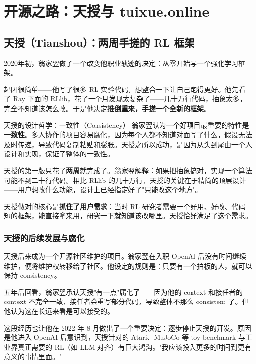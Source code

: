\documentclass[a4paper]{article}
\begin{document}
\section{开源之路：天授与 tuixue.online}

\subsection{天授（Tianshou）：两周手搓的 RL 框架}

2020年初，翁家翌做了一个改变他职业轨迹的决定：从零开始写一个强化学习框架。

起因很简单——他写了很多 RL 实验代码，想整合一下让自己跑得更好。他先看了 Ray 下面的 RLlib，花了一个月发现太复杂了——几十万行代码，抽象太多，完全不知道该怎么改。于是他决定\textbf{推倒重来，手搓一个全新的框架}。

\begin{importantbox}{天授的设计哲学：一致性（Consistency）}
翁家翌认为一个好项目最重要的特性是\textbf{一致性}。多人协作的项目容易腐化，因为每个人都不知道对面写了什么，假设无法及时传递，导致代码复制粘贴和膨胀。天授之所以成功，是因为从头到尾由一个人设计和实现，保证了整体的一致性。
\end{importantbox}

天授的第一版只花了\textbf{两周}就完成了。翁家翌解释：如果把抽象搞对，实现一个算法可能不到二十行代码。相比 RLlib 的几十万行，天授的关键在于精简的顶层设计——用户想改什么功能，设计上已经指定好了"只能改这个地方"。

天授做对的核心是\textbf{抓住了用户需求}：当时 RL 研究者需要一个好用、好改、代码短的框架，能直接拿来用，研究一下就知道该改哪里。天授恰好满足了这个需求。

\subsubsection{天授的后续发展与腐化}

天授后来成为一个开源社区维护的项目。翁家翌在入职 OpenAI 后没有时间继续维护，便将维护权转移给了社区。他设定的规则是：只要有一个拍板的人，就可以保持 consistency。

五年后回看，翁家翌承认天授"有一点"腐化了——因为他的 context 和接任者的 context 不完全一致，接任者会重写部分代码，导致整体不那么 consistent 了。但他认为这在长远来看是可以接受的。

这段经历也让他在 2022 年 8 月做出了一个重要决定：逐步停止天授的开发。原因是他进入 OpenAI 后意识到，天授针对的 Atari、MuJoCo 等 toy benchmark 与工业界真正需要的 RL（如 LLM 对齐）有巨大鸿沟。"我应该投入更多的时间到更有意义的事情里面。"
\end{document}
